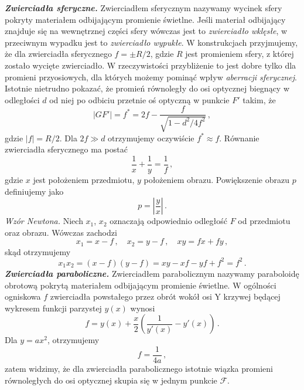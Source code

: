 \documentclass[../main.tex]{subfiles}
\begin{document}
\textbf{\textit{Zwierciadła sferyczne.}} Zwierciadłem sferycznym nazywamy wycinek sfery pokryty materiałem odbijającym promienie świetlne. Jeśli materiał odbijający znajduje się na wewnętrznej części sfery wówczas jest to \textit{zwierciadło wklęsłe}, w przeciwnym wypadku jest to \textit{zwierciadło wypukłe}. W konstrukcjach przyjmujemy, że dla zwierciadła sferycznego \(f=\pm R/2\), gdzie \(R\) jest promieniem sfery, z której zostało wycięte zwierciadło. W rzeczywistości  przybliżenie to jest dobre tylko dla promieni przyosiowych, dla których możemy pominąć wpływ \textit{aberracji sferycznej}. Istotnie nietrudno pokazać, że promień równoległy do osi optycznej biegnący w odległości \(d\) od niej po odbiciu przetnie oś optyczną w punkcie \(F'\) takim, że
\begin{equation*}
    |GF'|=f^*=2f-\frac{f}{\sqrt{1-d^2/4f^2}}\,,
\end{equation*}
gdzie \(|f|=R/2\). Dla \(2f\gg d\) otrzymujemy oczywiście \(f^*\approx f\). Równanie zwierciadła sferycznego ma postać
\begin{equation*}
    \frac{1}{x}+\frac{1}{y}=\frac{1}{f}\,,
\end{equation*}
gdzie \(x\) jest położeniem przedmiotu, \(y\) położeniem obrazu. Powiększenie obrazu \(p\) definiujemy jako
\begin{equation*}
    p=\left|\frac{y}{x}\right|\,.
\end{equation*}
\textit{Wzór Newtona.} Niech \(x_1\), \(x_2\) oznaczają odpowiednio odległość \(F\) od przedmiotu oraz obrazu. Wówczas zachodzi
\begin{equation*}
    x_1=x-f\,,\quad x_2=y-f\,,\quad xy=fx+fy\,,
\end{equation*}
skąd otrzymujemy
\begin{equation*}
    x_1x_2=(x-f)(y-f)=xy-xf-yf+f^2=f^2\,.
\end{equation*}
\indent \textbf{\textit{Zwierciadła paraboliczne.}} Zwierciadłem parabolicznym nazywamy paraboloidę obrotową pokrytą materiałem odbijającym promienie świetlne. W ogólności ogniskowa \(f\) zwierciadła powstałego przez obrót wokół osi Y krzywej będącej wykresem funkcji parzystej \(y(x)\) wynosi
\begin{equation*}
   f=y(x)+\frac{x}{2}\left(\frac{1}{y'(x)}-y'(x)\right)\,.
\end{equation*}
Dla \(y=ax^2\), otrzymujemy
\begin{equation*}
    f=\frac{1}{4a}\,,
\end{equation*}
zatem widzimy, że dla zwierciadła parabolicznego istotnie wiązka promieni równoległych do osi optycznej skupia się w jednym punkcie \(\mathcal{F}\).
\medskip
\end{document}
